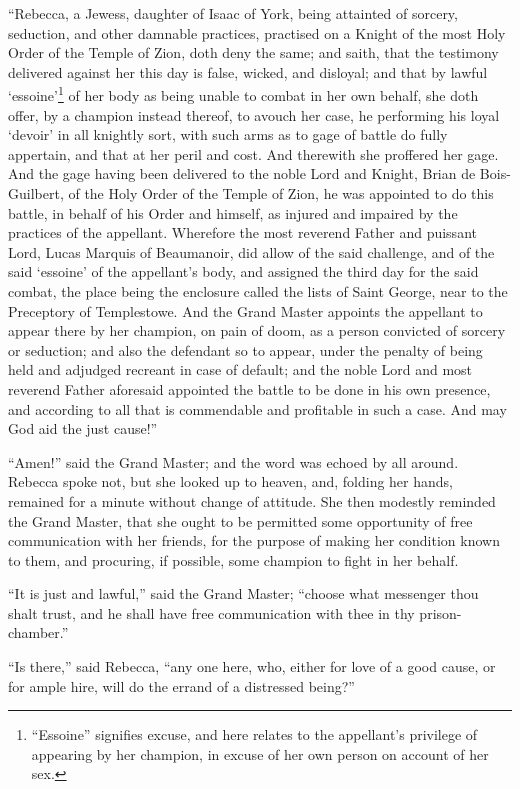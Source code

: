 ``Rebecca, a Jewess, daughter of Isaac of York, being attainted of
sorcery, seduction, and other damnable practices, practised on a Knight
of the most Holy Order of the Temple of Zion, doth deny the same; and
saith, that the testimony delivered against her this day is false,
wicked, and disloyal; and that by lawful `essoine'\footnote{``Essoine''
signifies excuse, and here relates to the
appellant's privilege of appearing by her champion, in excuse of her own
person on account of her sex.} of her body
as being unable to combat in her own behalf, she doth offer, by a
champion instead thereof, to avouch her case, he performing his loyal
`devoir' in all knightly sort, with such arms as to gage of battle do
fully appertain, and that at her peril and cost. And therewith she
proffered her gage. And the gage having been delivered to the noble Lord
and Knight, Brian de Bois-Guilbert, of the Holy Order of the Temple of
Zion, he was appointed to do this battle, in behalf of his Order and
himself, as injured and impaired by the practices of the appellant.
Wherefore the most reverend Father and puissant Lord, Lucas Marquis of
Beaumanoir, did allow of the said challenge, and of the said `essoine'
of the appellant's body, and assigned the third day for the said combat,
the place being the enclosure called the lists of Saint George, near to
the Preceptory of Templestowe. And the Grand Master appoints the
appellant to appear there by her champion, on pain of doom, as a person
convicted of sorcery or seduction; and also the defendant so to appear,
under the penalty of being held and adjudged recreant in case of
default; and the noble Lord and most reverend Father aforesaid appointed
the battle to be done in his own presence, and according to all that is
commendable and profitable in such a case. And may God aid the just
cause!''

``Amen!'' said the Grand Master; and the word was echoed by all around.
Rebecca spoke not, but she looked up to heaven, and, folding her hands,
remained for a minute without change of attitude. She then modestly
reminded the Grand Master, that she ought to be permitted some
opportunity of free communication with her friends, for the purpose of
making her condition known to them, and procuring, if possible, some
champion to fight in her behalf.

``It is just and lawful,'' said the Grand Master; ``choose what
messenger thou shalt trust, and he shall have free communication with
thee in thy prison-chamber.''

``Is there,'' said Rebecca, ``any one here, who, either for love of a
good cause, or for ample hire, will do the errand of a distressed
being?''

